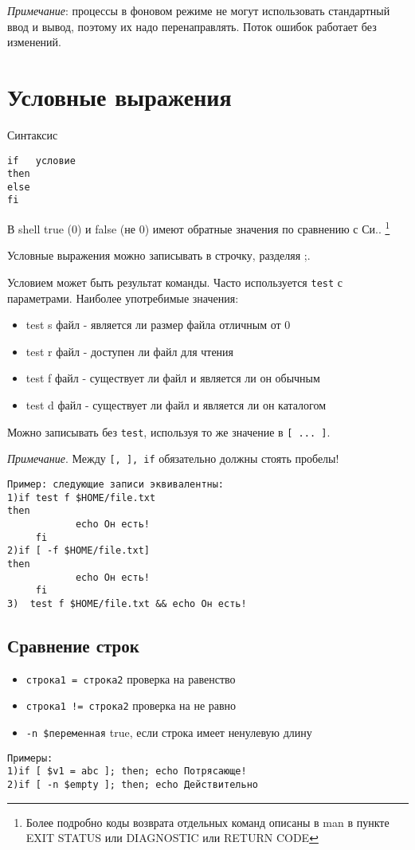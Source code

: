\emph{Примечание}: процессы в фоновом режиме не могут использовать стандартный ввод и вывод, поэтому их надо перенаправлять. Поток ошибок работает без изменений.


\section{Условные выражения}

Синтаксис
\begin{verbatim}
if   условие 		
then 
else 	
fi 					 
\end{verbatim}

В shell true (0)  и false (не 0) имеют обратные значения по сравнению с Си.\label{shellreturncode}. \footnote{Более подробно коды возврата отдельных команд описаны в man в пункте EXIT STATUS или DIAGNOSTIC или RETURN CODE}

Условные выражения можно записывать в строчку, разделяя ;.

Условием может быть результат команды. Часто используется \verb+test+ с параметрами. Наиболее употребимые значения:
\begin{itemize}
\item test s файл  - является ли размер файла отличным от 0
\item test r файл  - доступен ли файл для чтения
\item test f файл  - существует ли файл и является ли он обычным
\item test d файл  - существует ли файл и является ли он каталогом
\end{itemize}

Можно записывать без \verb+test+, используя то же значение в \verb+[ ... ]+.

\emph{Примечание}. Между \verb+[, ], if+ обязательно должны стоять пробелы!

\begin{verbatim}
Пример: следующие записи эквивалентны:
1)if test f $HOME/file.txt
then
            echo Он есть!
     fi
2)if [ -f $HOME/file.txt]
then
            echo Он есть!
     fi
3)  test f $HOME/file.txt && echo Он есть!
\end{verbatim}

\subsection{Сравнение строк}
 
\begin{itemize}
\item \verb+строка1 = строка2+  проверка на равенство
\item \verb+строка1 != строка2+  проверка на не равно
\item \verb+-n $переменная+  true, если строка имеет ненулевую длину
\end{itemize}
\begin{verbatim}
Примеры:
1)if [ $v1 = abc ]; then; echo Потрясающе!
2)if [ -n $empty ]; then; echo Действительно
\end{verbatim}

